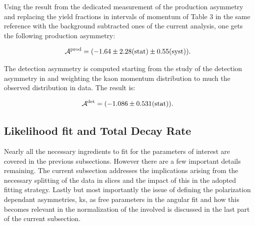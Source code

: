 
Using the result from the dedicated \lhcb measurement of the production asymmetry \cite{LHCb-PAPER-2014-042}
and replacing the yield fractions in intervals of \Bs momentum of Table 3 in the same reference with the background
subtracted \BsJpsiKst ones of the current analysis, one gets the following production asymmetry:

\begin{equation}
    \centering
    \Aprod = (-1.64 \pm 2.28 \stat \pm 0.55 \syst).
  \label{prod_assym}
\end{equation}

\noindent The detection asymmetry is computed starting from the \lhcb study of the detection asymmetry
in \cite{LHCb-PAPER-2014-013} and weighting the kaon momentum distribution to much the observed
distribution in \BsJpsiKst data. The result is:

\begin{equation}
    \centering
    \Adet  = (-1.086 \pm 0.531 \stat).
  \label{det_assym}
\end{equation}

\subsection{Likelihood fit and Total Decay Rate}
\label{Total_Decay_Rate}

Nearly all the necessary ingredients to fit for the parameters of interest are covered in the previous subsections.
However there are a few important details remaining. The current subsection addresses the
implications arising from the necessary splitting of the data in slices and the impact of this in the adopted
fitting strategy. Lastly but most importantly the issue of defining
the polarization dependant \CP asymmetries, \Acp{k}, as free parameters in the angular fit and how this becomes
relevant in the normalization of the \pdfs involved is discussed in the last part of the current subsection.

